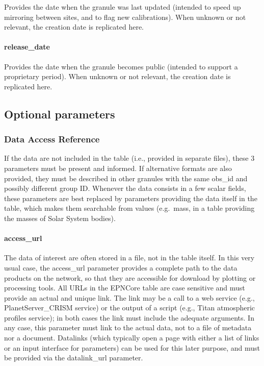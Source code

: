\documentclass[11pt,a4paper]{ivoa}
\begin{document}
Provides the date when the granule was last updated
(intended to speed up mirroring between sites, and to flag new calibrations).
When unknown or not relevant, the creation date is replicated here.

\paragraph{release\_date}

Provides the date when the granule becomes public
(intended to support a proprietary period).
When unknown or not relevant, the creation date is replicated here.

\subsection{Optional parameters}

\subsubsection{Data Access Reference}

If the data are not included in the table
(i.e., provided in separate files),
these 3 parameters must be present and informed. If alternative
formats are also provided, they must be described in other granules
with the same obs\_id and possibly different group ID. Whenever the
data consists in a few scalar fields, these parameters are best replaced
by parameters providing the data itself in the table, which makes them
searchable from values (e.g.\ mass, in a table providing the masses of
Solar System bodies).

\paragraph{access\_url}

The data of interest are often stored in a file, not in the table itself.
In this very usual case, the access\_url parameter provides
a complete path to the data products on the network, so that they are
accessible for download by plotting or processing tools. All URLs in the
EPNCore table are case sensitive and must provide an actual and unique
link. The link may be a call to a web service (e.g., PlanetServer\_CRISM
service) or the output of a script (e.g., Titan atmospheric profiles
service); in both cases the link must include the adequate arguments. In
any case, this parameter must link to the actual data, not to a file of
metadata nor a document. Datalinks (which typically open a page with
either a list of links or an input interface for parameters) can be
used for this later purpose, and must be provided via the datalink\_url
parameter.
\end{document}
